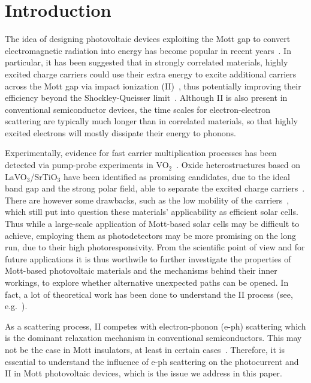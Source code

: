 \documentclass[aps,prb,groupedaddress,showpacs,twocolumn,superscriptaddress,10pt]{revtex4-2}
\begin{document}
\maketitle   
 

\section{Introduction} 
\label{sec:intro}

The idea of designing photovoltaic devices exploiting the Mott gap to convert electromagnetic radiation into energy has become popular in recent years~\cite{mano.10,li.ch.13,gu.gu.13,co.ma.14,wa.li.15}. In particular, it has been suggested that in strongly correlated materials, highly excited charge carriers could use their extra energy to excite additional carriers across the Mott gap via impact ionization (II)~\cite{mano.10,co.ma.14}, thus potentially improving their efficiency beyond the Shockley-Queisser limit~\cite{sh.qu.61}. Although II is also present in conventional semiconductor devices, the time scales for electron-electron scattering are typically much longer than in correlated materials, so that highly excited electrons will mostly dissipate their energy to phonons. 

Experimentally, evidence for fast carrier multiplication processes has been detected via pump-probe experiments in VO$_2$~\cite{ho.bi.16}. Oxide heterostructures based on LaVO$_3$/SrTiO$_3$ have been identified as promising candidates, due to the ideal band gap and the strong polar field, able to separate the excited charge carriers~\cite{as.bl.13}. There are however some drawbacks, such as the low mobility of the carriers~\cite{wa.li.15,je.re.18}, which still put into question these materials’ applicability as efficient solar cells. Thus while a large-scale application of Mott-based solar cells may be difficult to achieve, employing them as photodetectors may be more promising on the long run, due to their high photoresponsivity. From the scientific point of view and for future applications it is thus worthwile to further investigate the properties of Mott-based photovoltaic materials and the mechanisms behind their inner workings, to explore whether alternative unexpected paths can be opened. In fact, a lot of theoretical work has been done to understand the II process (see, e.g.~\cite{co.ma.14,ec.we.11,ec.we.13,we.he.14,pe.be.19,so.do.18,ka.wo.20,mano.19,ma.ev.22}).

As a scattering process, II competes with electron-phonon (e-ph) scattering which is the dominant relaxation mechanism in conventional semiconductors. This may not be the case in Mott insulators, at least in certain cases~\cite{co.ma.14}. Therefore, it is essential to understand the influence of e-ph scattering on the photocurrent and II in Mott photovoltaic devices, which is the issue we address in this paper.
\end{document}
